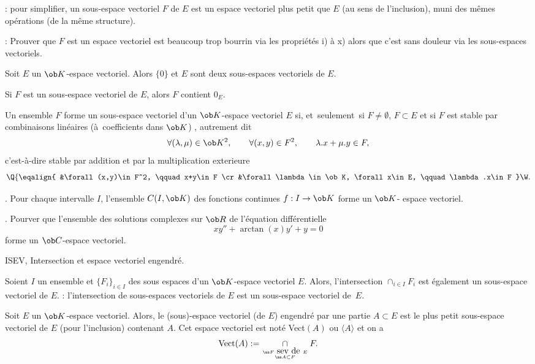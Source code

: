 \Remarque : pour simplifier, un sous-espace vectoriel $F$ de $E$ est un espace vectoriel plus petit que $E$ (au sens de l'inclusion), muni des m\^emes op\'erations (de la m\^eme structure). 
\bigskip

\Remarque : Prouver que $F$ est un espace vectoriel est beaucoup trop bourrin via les propri\'et\'es i) \`a x) alors que 
c'est sans douleur via les sous-espaces vectoriels. 
\bigskip

\Propriete []  Soit $E$ un $\ob K$-espace vectoriel. Alors $\{0\}$ et $E$ sont deux sous-espaces vectoriels de $E$. 
\bigskip

\Propriete []  Si $F$ est un sous-espace vectoriel de $E$, alors $F$ contient $0_E$. 
\bigskip


\Propriete []  Un ensemble $F$ forme un sous-espace vectoriel d'un $\ob K$-espace vectoriel $E$ si, et~seulement~si
$F\neq\emptyset$, $F\subset E$ et si $F$ est stable par combinaisons lin\'eaires 
(\`a~coefficients dans $\ob K$) , autrement dit
$$
\forall (\lambda,\mu)\in\ob K^2 , \qquad  \forall (x,y)\in F^2 ,\qquad \lambda. x+\mu. y\in F, 
$$
c'est-\`a-dire stable par addition et par la multiplication exterieure
$$
\Q\{\eqalign{
	&\forall (x,y)\in F^2, \qquad x+y\in F
	\cr
	&\forall \lambda\in\ob K, \forall x\in E, \qquad \lambda.x\in F
}\W.
$$

\Exemple. Pour chaque intervalle $I$, l'ensemble $\sc C(I,\ob K)$ des fonctions continues $f:I\to\ob K$ forme un $\ob K$-
espace vectoriel.

 \Exercice. Pourver que l'ensemble des solutions complexes sur $\ob R$ de l'\'equation diff\'erentielle 
$$
x y''+\arctan(x)y'+y=0
$$ 
forme un $\ob C$-espace vectoriel. 
\bigskip

\Subsection ISEV, Intersection et espace vectoriel engendr\'e.
\bigskip

\Propriete []  Soient $I$ un ensemble et $\{F_i\}_{i\in I}$ des sous espaces d'un $\ob K$-espace vectoriel $E$. 
Alors, l'intersection $\cap_{i\in I}F_i$ est \'egalement un sous-espace vectoriel de $E$. 
\bigskip
\Remarque : l'intersection de sous-espaces vectoriels de $E$ est un sous-espace vectoriel de~$E$. 
\bigskip


\Definition []  Soit $E$ un $\ob K$-espace vectoriel. 
Alors, le (sous)-espace vectoriel (de $E$) engendr\'e par une partie $A\subset E$ est le plus petit sous-espace vectoriel de $E$ (pour l'inclusion) contenant $A$. 
Cet espace vectoriel est not\'e Vect$(A)$ ou $\langle A\rangle$ et on a 
$$
\mbox{Vect}(A):=\mathop{\cap}\limits_{\ss F \mbox{ sev de }E\atop\ss A\subset F}F.
$$

